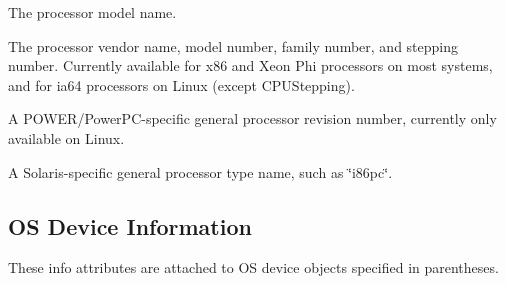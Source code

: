 \begin{DoxyDescription}
\item[C\+P\+U\+Model ]The processor model name. 
\item[C\+P\+U\+Vendor, C\+P\+U\+Model\+Number, C\+P\+U\+Family\+Number, C\+P\+U\+Stepping ]The processor vendor name, model number, family number, and stepping number. Currently available for x86 and Xeon Phi processors on most systems, and for ia64 processors on Linux (except C\+P\+U\+Stepping).  
\item[C\+P\+U\+Revision ]A P\+O\+W\+E\+R/\+Power\+P\+C-\/specific general processor revision number, currently only available on Linux.  
\item[C\+P\+U\+Type ]A Solaris-\/specific general processor type name, such as \char`\"{}i86pc\char`\"{}.  
\end{DoxyDescription}

 \hypertarget{a00386_attributes_info_osdev}{}\subsection{O\+S Device Information}\label{a00386_attributes_info_osdev}
These info attributes are attached to OS device objects specified in parentheses.


